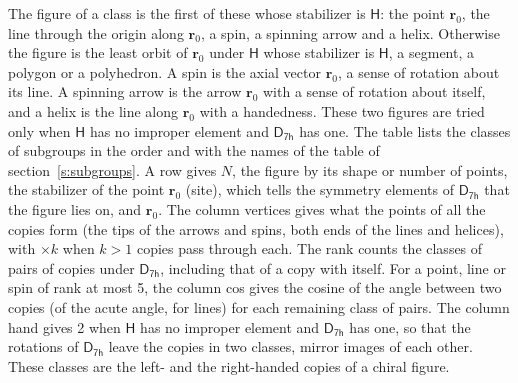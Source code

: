 \documentclass[10pt,a4paper]{article}
\numberwithin{equation}{section}
\newcommand{\grp}[1]{\mathsf{#1}}
\newcommand{\pointr}{\mathbf{r}}
\begin{document}
\leavevmode\label{n:head.figure}The figure of a class is the first of these whose stabilizer is $\grp{H}$: the point $\pointr_0$, the line through the origin along $\pointr_0$, a spin, a spinning arrow and a helix. Otherwise the figure is the least orbit of $\pointr_0$ under $\grp{H}$ whose stabilizer is $\grp{H}$, a segment, a polygon or a polyhedron. A spin is the axial vector $\pointr_0$, a sense of rotation about its line. A spinning arrow is the arrow $\pointr_0$ with a sense of rotation about itself, and a helix is the line along $\pointr_0$ with a handedness. These two figures are tried only when $\grp{H}$ has no improper element and $\grp{D_{7h}}$ has one. The table lists the classes of subgroups in the order and with the names of the table of section~\ref{s:subgroups}. \label{n:head.site}A row gives $N$, the figure by its shape or number of points, the stabilizer of the point $\pointr_0$ (site), which tells the symmetry elements of $\grp{D_{7h}}$ that the figure lies on, and $\pointr_0$. \label{n:head.vertices}The column vertices gives what the points of all the copies form (the tips of the arrows and spins, both ends of the lines and helices), with ${\times}k$ when $k > 1$ copies pass through each. \label{n:head.rank}The rank counts the classes of pairs of copies under $\grp{D_{7h}}$, including that of a copy with itself. \label{n:head.cos}For a point, line or spin of rank at most 5, the column cos gives the cosine of the angle between two copies (of the acute angle, for lines) for each remaining class of pairs. \label{n:head.hand}The column hand gives 2 when $\grp{H}$ has no improper element and $\grp{D_{7h}}$ has one, so that the rotations of $\grp{D_{7h}}$ leave the copies in two classes, mirror images of each other. These classes are the left- and the right-handed copies of a chiral figure.
\end{document}
